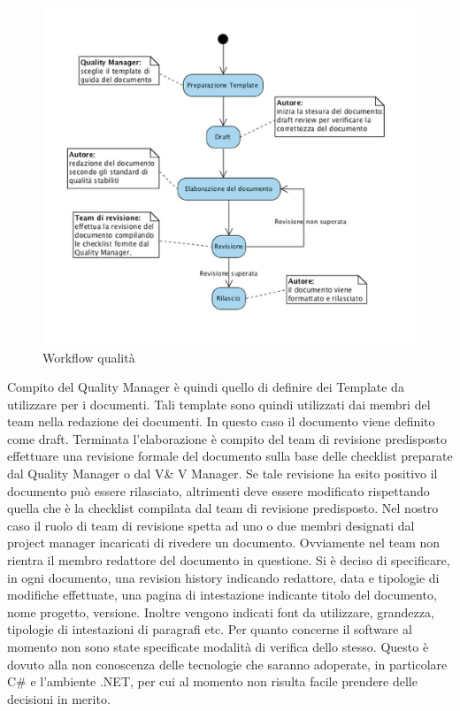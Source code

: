 \begin{figure}[tp]
\centering
\includegraphics[scale=.5]{img/11.png}
\caption{Workflow qualit\`{a}}
\label{fig:cd}
\end{figure}
Compito del Quality Manager \`{e} quindi quello di definire dei Template da utilizzare per i documenti. Tali template sono quindi utilizzati dai membri del team nella redazione dei documenti.
In questo caso il documento viene definito come draft. Terminata l\rq elaborazione \`{e} compito del team di revisione predisposto effettuare una revisione formale del documento sulla base delle checklist preparate dal Quality Manager o dal V\& V Manager. 
Se tale revisione ha esito positivo il documento pu\`{o} essere rilasciato, altrimenti deve essere modificato rispettando quella che \`{e} la checklist compilata dal team di revisione predisposto.
Nel nostro caso il ruolo di team di revisione spetta ad uno o due membri designati dal project manager incaricati di rivedere un documento. Ovviamente nel team non rientra il membro redattore del documento in questione.
Si \`{e} deciso di specificare, in ogni documento, una revision history indicando redattore, data e tipologie di modifiche effettuate, una pagina di intestazione indicante titolo del documento, nome progetto, versione. 
Inoltre vengono indicati font da utilizzare, grandezza, tipologie di intestazioni di paragrafi etc.
Per quanto concerne il software al momento non sono state specificate modalit\`{a} di verifica dello stesso. Questo \`{e} dovuto alla non conoscenza delle tecnologie che saranno adoperate, in particolare C\# e l\rq ambiente .NET, per cui al momento non risulta facile prendere delle decisioni in merito.
